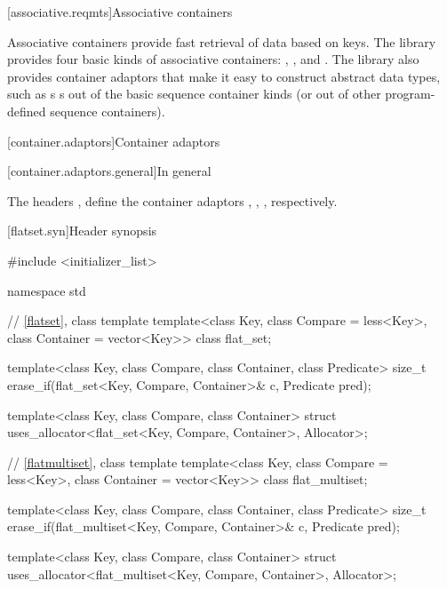 \noindent\makebox[\linewidth]{\rule{\textwidth}{0.4pt}}

\setcounter{subsection}{5}
[associative.reqmts]{Associative containers}

\pnum
Associative containers provide fast retrieval of data based on keys.
The library provides four basic kinds of associative containers:
,
,
and
. The library also provides container adaptors that
make it easy to construct abstract data types, such as s
s out of
the basic sequence container kinds (or out of other program-defined sequence
containers).

\noindent\makebox[\linewidth]{\rule{\textwidth}{0.4pt}}

\setcounter{chapter}{24}
\setcounter{section}{5}
[container.adaptors]{Container adaptors}

[container.adaptors.general]{In general}

\pnum
The headers , 
 define the container adaptors
, , 
, respectively.

\noindent\makebox[\linewidth]{\rule{\textwidth}{0.4pt}}

\setcounter{subsection}{3}
\begin{addedblock}
[flatset.syn]{Header  synopsis}%
%

\begin{codeblock}
#include <initializer_list>

namespace std {
  // \ref{flatset}, class template 
  template<class Key, class Compare = less<Key>, class Container = vector<Key>>
    class flat_set;

  template<class Key, class Compare, class Container, class Predicate>
    size_t erase_if(flat_set<Key, Compare, Container>& c, Predicate pred);

  template<class Key, class Compare, class Container>
    struct uses_allocator<flat_set<Key, Compare, Container>, Allocator>;

  // \ref{flatmultiset}, class template 
  template<class Key, class Compare = less<Key>, class Container = vector<Key>>
    class flat_multiset;

  template<class Key, class Compare, class Container, class Predicate>
    size_t erase_if(flat_multiset<Key, Compare, Container>& c, Predicate pred);

  template<class Key, class Compare, class Container>
    struct uses_allocator<flat_multiset<Key, Compare, Container>, Allocator>;
}
\end{codeblock}
\end{addedblock}

